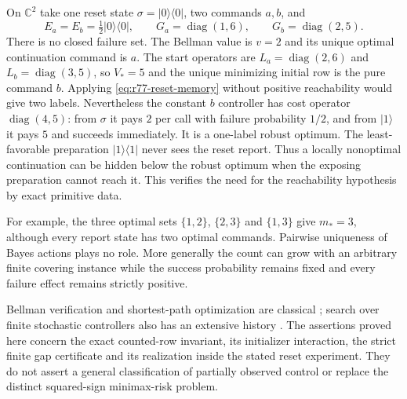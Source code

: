 \begin{example}
\label{ex:r77-reset-exposure}
On $\mathbb C^2$ take one reset state $\sigma=|0\rangle\langle0|$,
two commands $a,b$, and
\[
 E_a=E_b=\tfrac12|0\rangle\langle0|,
 \qquad G_a=\operatorname{diag}(1,6),\qquad
 G_b=\operatorname{diag}(2,5).
\]
There is no closed failure set.  The Bellman value is $v=2$ and its
unique optimal continuation command is $a$.  The start operators
are $L_a=\operatorname{diag}(2,6)$ and
$L_b=\operatorname{diag}(3,5)$, so $V_*=5$ and the unique minimizing
initial row is the pure command $b$.  Applying
\eqref{eq:r77-reset-memory} without positive reachability would give
two labels.  Nevertheless the constant $b$ controller has cost
operator $\operatorname{diag}(4,5)$: from $\sigma$ it pays $2$ per
call with failure probability $1/2$, and from $|1\rangle$ it pays
$5$ and succeeds immediately.  It is a one-label robust optimum.
The least-favorable preparation $|1\rangle\langle1|$ never sees the
reset report.  Thus a locally nonoptimal continuation can be hidden
below the robust optimum when the exposing preparation cannot reach
it.  This verifies the need for the reachability hypothesis by exact
primitive data.
\end{example}

For example, the three optimal sets $\{1,2\}$, $\{2,3\}$ and
$\{1,3\}$ give $m_*=3$, although every report state has two optimal
commands.  Pairwise uniqueness of Bayes actions plays no role.  More
generally the count can grow with an arbitrary finite covering
instance while the success probability remains fixed and every
failure effect remains strictly positive.

Bellman verification and shortest-path optimization are classical
\cite{BertsekasTsitsiklis91}; search over finite stochastic controllers
also has an extensive history \cite{Meuleau99,PoupartBoutilier03}.
The assertions proved here concern the exact counted-row invariant,
its initializer interaction, the strict finite gap certificate and
its realization inside the stated reset experiment.  They do not
assert a general classification of partially observed control or
replace the distinct squared-sign minimax-risk problem.
